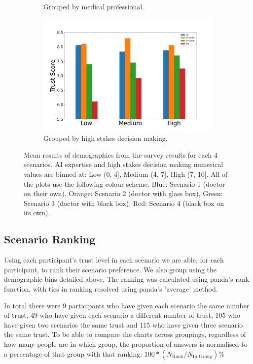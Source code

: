 \documentclass[manuscript,screen,review]{acmart}
\begin{document}
\begin{figure}[ht]
\begin{subfigure}[t]{.45\textwidth}
    \caption{Grouped by medical professional.}
  \end{subfigure}
  \begin{subfigure}[t]{.45\textwidth}
    \centering
    \includegraphics[width=\linewidth]{graphics/survey_averages/survey_stakes_grouped.png}
    \caption{Grouped by high stakes decision making.}
    \label{subfig:high stakes}
  \end{subfigure}
  \caption{Mean results of demographics from the survey results for each 4 scenarios. AI expertise and high stakes decision making numerical values are binned at: Low (0, 4], Medium (4, 7], High (7, 10]. All of the plots use the following colour scheme. Blue: Scenario 1 (doctor on their own), Orange: Scenario 2 (doctor with glass box), Green: Scenario 3 (doctor with black box), Red: Scenario 4 (black box on its own).}
  \label{fig:mean_survey_results}
\end{figure}

\subsection{Scenario Ranking}


Using each participant's trust level in each scenario we are able, for each participant, to rank their scenario preference. We also group using the demographic bins detailed above. The ranking was calculated using panda's rank function, with ties in ranking resolved using panda's 'average' method\cite{mckinney-proc-scipy-2010}.

In total there were 9 participants who have given each scenario the same number of trust, 49 who have given each scenario a different number of trust, 105 who have given two scenarios the same trust and 115 who have given three scenario the same trust.  To be able to compare the charts across groupings, regardless of how many people are in which group, the proportion of answers is normalised to a percentage of that group with that ranking: $100*(N_{\textrm{Rank}}/N_{\textrm{In Group}})$\%
\end{document}
